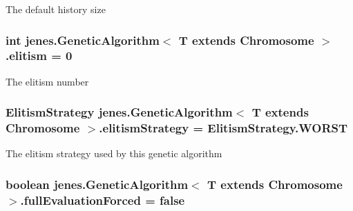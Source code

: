 The default history size \hypertarget{classjenes_1_1_genetic_algorithm_3_01_t_01extends_01_chromosome_01_4_ac4280b01e7da0ddc049050b19e28b8b9}{
\subsubsection[{elitism}]{\setlength{\rightskip}{0pt plus 5cm}int jenes.\-Genetic\-Algorithm$<$ T extends Chromosome $>$.elitism = 0\hspace{0.3cm}{\ttfamily [protected]}}}\label{classjenes_1_1_genetic_algorithm_3_01_t_01extends_01_chromosome_01_4_ac4280b01e7da0ddc049050b19e28b8b9}
The elitism number \hypertarget{classjenes_1_1_genetic_algorithm_3_01_t_01extends_01_chromosome_01_4_aacba3e1823ba66a2dd6d3c902f8ff719}{
\subsubsection[{elitism\-Strategy}]{\setlength{\rightskip}{0pt plus 5cm}Elitism\-Strategy jenes.\-Genetic\-Algorithm$<$ T extends Chromosome $>$.elitism\-Strategy = Elitism\-Strategy.\-W\-O\-R\-S\-T\hspace{0.3cm}{\ttfamily [protected]}}}\label{classjenes_1_1_genetic_algorithm_3_01_t_01extends_01_chromosome_01_4_aacba3e1823ba66a2dd6d3c902f8ff719}
The elitism strategy used by this genetic algorithm \hypertarget{classjenes_1_1_genetic_algorithm_3_01_t_01extends_01_chromosome_01_4_adb627d0c6d6744f53ef5c3b7506913e9}{
\subsubsection[{full\-Evaluation\-Forced}]{\setlength{\rightskip}{0pt plus 5cm}boolean jenes.\-Genetic\-Algorithm$<$ T extends Chromosome $>$.full\-Evaluation\-Forced = false\hspace{0.3cm}{\ttfamily [protected]}}}\label{classjenes_1_1_genetic_algorithm_3_01_t_01extends_01_chromosome_01_4_adb627d0c6d6744f53ef5c3b7506913e9}
